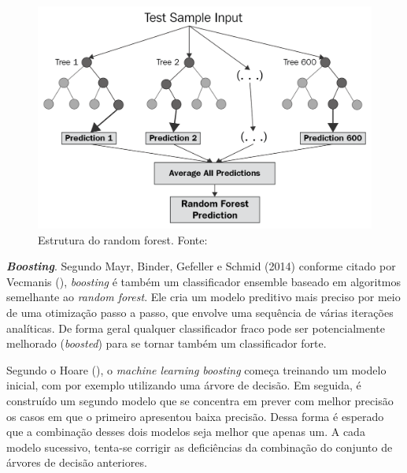 \begin{figure}[H]
    \centering
    \includegraphics[scale=0.3]{figuras/referencial_teorico/random_forest.png}
    \caption[Estrutura do random forest]{Estrutura do random forest. Fonte: \cite{Chakure:2019}}
    \label{fig:random_forest}
\end{figure}



\textbf{\textit{Boosting}}. Segundo Mayr, Binder, Gefeller e Schmid (2014) conforme citado por Vecmanis (\citeyear{Vecmanis:2019}), \textit{boosting} é também um classificador ensemble baseado em algoritmos semelhante ao \textit{random forest}. Ele cria um modelo preditivo mais preciso por meio de uma otimização passo a passo, que envolve uma sequência de várias iterações analíticas.  De forma geral qualquer classificador fraco pode ser potencialmente melhorado (\textit{boosted}) para se tornar também um classificador forte.

Segundo o Hoare (\citeyear{Hoare:2019}), o \textit{machine learning boosting} começa treinando um modelo inicial, com por exemplo utilizando uma árvore de decisão. Em seguida, é construído um segundo modelo que se concentra em prever com melhor precisão os casos em que o primeiro apresentou baixa precisão. Dessa forma é esperado que a combinação desses dois modelos seja melhor que apenas um. A cada modelo sucessivo, tenta-se corrigir as deficiências da combinação do conjunto de árvores de decisão anteriores.


